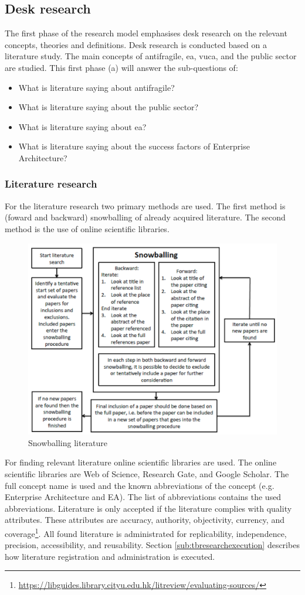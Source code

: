 \subsection{Desk research}
\label{sub:deskresearchphase}
The first phase of the research model emphasises desk research on the relevant concepts, theories and definitions. Desk research is conducted based on a literature study. The main concepts of \gls{antifragile}, \acrshort{ea}, \acrshort{vuca}, and the public sector are studied. This first phase (a) will answer the sub-questions of:
\begin{itemize}
	\item{What is literature saying about \gls{antifragile}?}
	\item{What is literature saying about the public sector?}
	\item{What is literature saying about \acrlong{ea}?}
	\item{What is literature saying about the success factors of Enterprise Architecture?}
\end{itemize}

\subsubsection{Literature research}
For the literature research two primary methods are used. The first method is (foward and backward) snowballing of already acquired literature. The second method is the use of online scientific libraries.

\begin{figure}[H]
	\centering
	\includegraphics[width=0.6\linewidth]{images/snowball}
	\caption[Snowballing literature]{Snowballing literature \parencite{Wohlin2014}}
	\label{fig:snowball}
\end{figure}
For finding relevant literature online scientific libraries are used. The online scientific libraries are Web of Science, Research Gate, and Google Scholar. The full concept name is used and the known abbreviations of the concept (e.g. Enterprise Architecture and EA). The list of abbreviations contains the used abbreviations. Literature is only accepted if the literature complies with quality attributes. These attributes are accuracy, authority, objectivity, currency, and coverage\footnote{\url{https://libguides.library.cityu.edu.hk/litreview/evaluating-sources/}}. All found literature is administrated for replicability, independence, precision, accessibility, and reusability. Section \ref{sub:tbresearchexecution} describes how literature registration and administration is executed.

